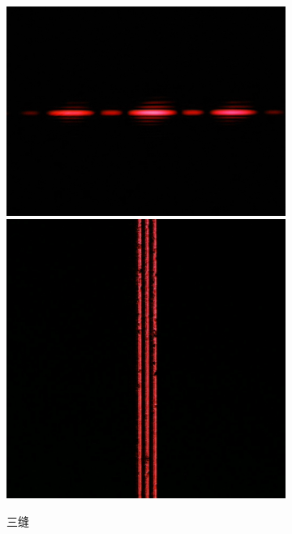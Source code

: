 \documentclass[a4paper]{article}
\begin{document}
\begin{figure}[htbp]
\begin{subfigure}[htbp]{0.3\textwidth}
        \includegraphics[width=\textwidth]{fre-done/3-1.JPG}
        \includegraphics[width=\textwidth]{img-done/3-1.JPG}
        \caption{三缝}
        \label{3-1}
    \end{subfigure}
    \begin{subfigure}[htbp]{0.3\textwidth}
        \centering

\end{subfigure}
\end{figure}
\end{document}
